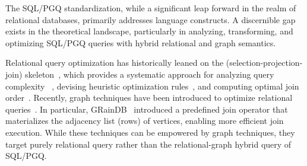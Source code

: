 The SQL/PGQ standardization, while a significant leap forward in the realm of relational databases, primarily addresses language constructs. A discernible gap exists in the theoretical landscape, particularly in analyzing, transforming, and optimizing SQL/PGQ queries with hybrid relational and graph semantics. %

Relational query optimization has historically leaned on the \spj (selection-projection-join) skeleton~\cite{spj,Chaudhuri98}, which provides a systematic approach for analyzing query complexity~\cite{IbarakiK84,ChatterjiEGY02} , devising heuristic optimization rules~\cite{Chaudhuri99heuristics,goldsteinheuristics}, and
computing optimal join order~\cite{Haffnerjoinorder,chenjoinorder}. Recently, graph techniques have been introduced to optimize relational queries~\cite{wanderjoin,Haffnerjoinorder,gqfast,graindb}. %
In particular, GRainDB~\cite{graindb} introduced a predefined join operator that materializes the adjacency list (rows) of vertices, enabling more efficient join execution. While these techniques can be empowered by graph techniques, they target purely relational query rather than the relational-graph hybrid query of SQL/PGQ.

